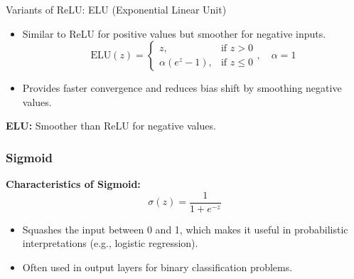\documentclass[serif, aspectratio=169]{beamer}
\begin{document}
\begin{frame}{Variants of ReLU: ELU (Exponential Linear Unit)}
    \begin{itemize}
        \item Similar to ReLU for positive values but smoother for negative inputs.
        \begin{equation*}
            \text{ELU}(z) =
            \begin{cases}
                z, & \text{if } z > 0 \\
                \alpha (e^z - 1), & \text{if } z \leq 0
            \end{cases}, \quad \alpha = 1
        \end{equation*}
        \item Provides faster convergence and reduces bias shift by smoothing negative values.
    \end{itemize}
                \begin{center}
            \end{center}
            \vspace{-0.3cm}
            \centering
            \textbf{ELU:} Smoother than ReLU for negative values.
\end{frame}

\begin{frame}
    \frametitle{Sigmoid}

    \textbf{Characteristics of Sigmoid:}
    \begin{equation*}
              \sigma(z) = \frac{1}{1 + e^{-z}}
    \end{equation*}
    \begin{itemize}
        \item Squashes the input between 0 and 1, which makes it useful in probabilistic interpretations (e.g., logistic regression).
        \item Often used in output layers for binary classification problems.
    \end{itemize}

    \begin{center}
    \end{center}
\end{frame}
\end{document}
